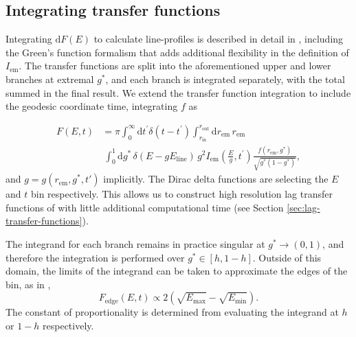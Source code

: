 \documentclass[fleqn,usenatbib]{mnras}
\renewcommand{\d}{\text{d}}
\begin{document}
\subsection{Integrating transfer functions}
\label{sec:transfer-function-integration}

Integrating $\d F(E)$ to calculate line-profiles is described in detail in \cite{dauser_broad_2010}, including the Green's function formalism that adds additional flexibility in the definition of $I_\text{em}$. The transfer functions are split into the aforementioned upper and lower branches at extremal $g^\ast$, and each branch is integrated separately, with the total summed in the final result. We extend the transfer function integration to include the geodesic coordinate time, integrating $f$ as

\begin{align}
    \label{eq:transfer-integration}
    F(E, t) &=
    \pi
    \int_0^\infty \d t^\prime \delta(t - t^\prime)
    \int_{r_\text{in}}^{r_\text{out}} \d r_\text{em}\,r_\text{em} \nonumber \\
    &\ \int_0^1 \d g^\ast\, \delta(E - gE_\text{line})\, g^2 I_\text{em}\left(\frac{E}{g}, t^\prime\right) \frac{f(r_\text{em}, g^\ast)}{\sqrt{g^\ast (1 - g^\ast)}},
\end{align}
\noindent and $g = g( r_\text{em}, g^\ast, t')$ implicitly. The Dirac delta functions are selecting the $E$ and $t$ bin respectively. This allows us to construct high resolution lag transfer functions of \cite{reynolds_x-ray_1999} with little additional computational time (see Section \ref{sec:lag-transfer-functions}). 

The integrand for each branch remains in practice singular at $g^\ast \rightarrow (0, 1)$, and therefore the integration is performed over $g^\ast \in [h, 1 - h]$. Outside of this domain, the limits of the integrand can be taken to approximate the edges of the bin, as in \cite{dauser_broad_2010},
\begin{equation}
   F_\text{edge}(E,t) \propto 2\left( \sqrt{E_\text{max}} - \sqrt{E_\text{min}} \right).
\end{equation}
The constant of proportionality is determined from evaluating the integrand at $h$ or $1 - h$ respectively.
\end{document}
